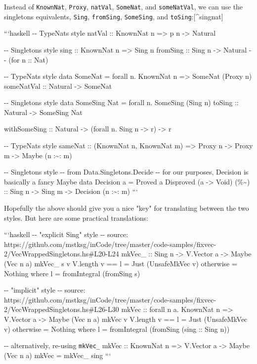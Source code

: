 \documentclass[]{article}
\begin{document}
Instead of \texttt{KnownNat}, \texttt{Proxy}, \texttt{natVal}, \texttt{SomeNat},
and \texttt{someNatVal}, we can use the singletons equivalents, \texttt{Sing},
\texttt{fromSing}, \texttt{SomeSing}, and \texttt{toSing}:{[}\^{}singnat{]}

```haskell -\/- TypeNats style natVal :: KnownNat n =\textgreater{} p n
-\textgreater{} Natural

-\/- Singletons style sing :: KnownNat n =\textgreater{} Sing n fromSing :: Sing
n -\textgreater{} Natural -\/- (for n :: Nat)

-\/- TypeNats style data SomeNat = forall n. KnownNat n =\textgreater{} SomeNat
(Proxy n) someNatVal :: Natural -\textgreater{} SomeNat

-\/- Singletons style data SomeSing Nat = forall n. SomeSing (Sing n) toSing ::
Natural -\textgreater{} SomeSing Nat

withSomeSing :: Natural -\textgreater{} (forall n. Sing n -\textgreater{} r)
-\textgreater{} r

-\/- TypeNats style sameNat :: (KnownNat n, KnownNat m) =\textgreater{} Proxy n
-\textgreater{} Proxy m -\textgreater{} Maybe (n :\textasciitilde{}: m)

-\/- Singletons style -\/- from Data.Singletons.Decide -\/- for our purposes,
Decision is basically a fancy Maybe data Decision a = Proved a \textbar{}
Disproved (a -\textgreater{} Void) (\%\textasciitilde{}) :: Sing n
-\textgreater{} Sing m -\textgreater{} Decision (n :\textasciitilde{}: m) ```

Hopefully the above should give you a nice "key" for translating between the two
styles. But here are some practical translations:

```haskell -\/- "explicit Sing" style -\/- source:
https://github.com/mstksg/inCode/tree/master/code-samples/fixvec-2/VecWrappedSingletons.hs\#L20-L24
mkVec\_ :: Sing n -\textgreater{} V.Vector a -\textgreater{} Maybe (Vec n a)
mkVec\_ s v \textbar{} V.length v == l = Just (UnsafeMkVec v) \textbar{}
otherwise = Nothing where l = fromIntegral (fromSing s)

-\/- "implicit" style -\/- source:
https://github.com/mstksg/inCode/tree/master/code-samples/fixvec-2/VecWrappedSingletons.hs\#L26-L30
mkVec :: forall n a. KnownNat n =\textgreater{} V.Vector a -\textgreater{} Maybe
(Vec n a) mkVec v \textbar{} V.length v == l = Just (UnsafeMkVec v) \textbar{}
otherwise = Nothing where l = fromIntegral (fromSing (sing :: Sing n))

-\/- alternatively, re-using \texttt{mkVec\_} mkVec :: KnownNat n
=\textgreater{} V.Vector a -\textgreater{} Maybe (Vec n a) mkVec = mkVec\_ sing
```
\end{document}
